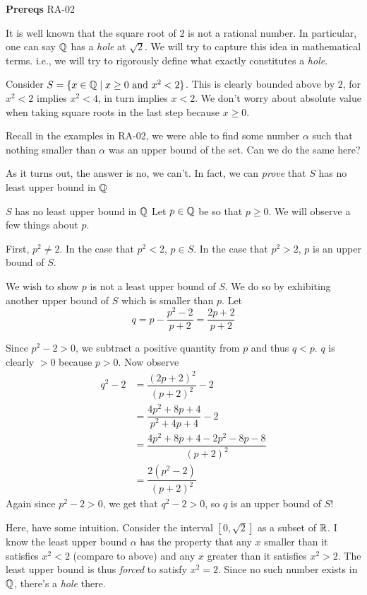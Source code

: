 

\textbf{Prereqs} RA-02

It is well known that the square root of $2$ is not a rational number. In particular, one can say $\mathbb{Q}$ has a \emph{hole} at $\sqrt 2$. We will try to capture this idea in mathematical terms. i.e., we will try to rigorously define what exactly constitutes a \emph{hole}.

Consider $S = \{x \in \mathbb{Q} \space \mid \space x \geq 0 \text{ and } x^2 < 2\}$. This is clearly bounded above by $2$, for $x^2 < 2$ implies $x^2 < 4$, in turn implies $x < 2$. We don't worry about absolute value when taking square roots in the last step because $x \geq 0$.

Recall in the examples in RA-02, we were able to find some number $\alpha$ such that nothing smaller than $\alpha$ was an upper bound of the set. Can we do the same here?

As it turns out, the answer is no, we can't. In fact, we can \emph{prove} that $S$ has no least upper bound in $\mathbb{Q}$

\begin{SWP}{\lm}{$S$ has no least upper bound in $\mathbb{Q}$}
Let $p \in \mathbb{Q}$ be so that $p \geq 0$. We will observe a few things about $p$.

First, $p^2 \neq 2$. In the case that $p^2 < 2$, $p \in S$. In the case that $p^2 > 2$, $p$ is an upper bound of $S$.

We wish to show $p$ is not a least upper bound of $S$. We do so by exhibiting another upper bound of $S$ which is smaller than $p$. Let
$$
q = p - \dfrac{p^2 - 2}{p + 2} = \dfrac{2p + 2}{p + 2}
$$

Since $p^2 - 2 > 0$, we subtract a positive quantity from $p$ and thus $q < p$. $q$ is clearly $> 0$ because $p > 0$. Now observe
\begin{align*}
q^2 - 2 &= \dfrac{(2p+2)^2}{(p+2)^2} - 2\\
		&= \dfrac{4p^2 + 8p + 4}{p^2 + 4p + 4} - 2\\
		&= \dfrac{4p^2 + 8p + 4 - 2p^2 - 8p - 8}{(p + 2)^2}\\
		&= \dfrac{2(p^2 - 2)}{(p + 2)^2}
\end{align*}
Again since $p^2 - 2 > 0$, we get that $q^2 - 2 > 0$, so $q$ is an upper bound of $S$!
\end{SWP}

Here, have some intuition. Consider the interval $[0, \sqrt 2]$ as a subset of $\mathbb{R}$. I know the least upper bound $\alpha$ has the property that any $x$ smaller than it satisfies $x^2 < 2$ (compare to above) and any $x$ greater than it satisfies $x^2 > 2$. The least upper bound is thus \emph{forced} to satisfy $x^2 = 2$. Since no such number exists in $\mathbb{Q}$, there's a \emph{hole} there.

